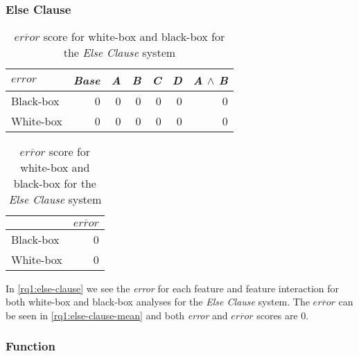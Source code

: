 \subsubsection*{Else Clause}

\begin{table}[H]
    \begin{minipage}{.5\linewidth}
        \centering
        \begin{tabular}{lrrrrrr}    \toprule
        $error$    & \emph{Base} & \emph{A} & \emph{B} & \emph{C} & \emph{D} & \emph{A} $\land$ \emph{B}   \\ \midrule
        Black-box & 0 & 0 & 0 & 0 & 0 & 0      \\
        White-box & 0 & 0 & 0 & 0 & 0 & 0      \\ \bottomrule
        \end{tabular}
        \caption{Respective \emph{error} scores for white-box and black-box {\perfInfluenceModel}s for the \emph{Else Clause} system.}
        \label{rq1:else-clause}
    \end{minipage}%
    \hspace{7mm}
    \begin{minipage}{.37\linewidth}
        \centering
        \begin{tabular}{lr}
            \toprule
                      & $\overline{error}$   \\ \midrule
            Black-box & 0              \\
            White-box & 0              \\ \bottomrule
            \end{tabular} 
            \caption{$\overline{error}$ score for white-box and black-box for the \emph{Else Clause} system}
            \label{rq1:else-clause-mean}
        \end{minipage}
    \end{table}
    
In \autoref{rq1:else-clause} we see the \emph{error} for each feature and feature interaction for both white-box and black-box 
analyses for the \emph{Else Clause} system. The $\overline{error}$ can be seen in \autoref{rq1:else-clause-mean} and 
both \emph{error} and $\overline{error}$ scores are $0$.

\subsubsection*{Function}

